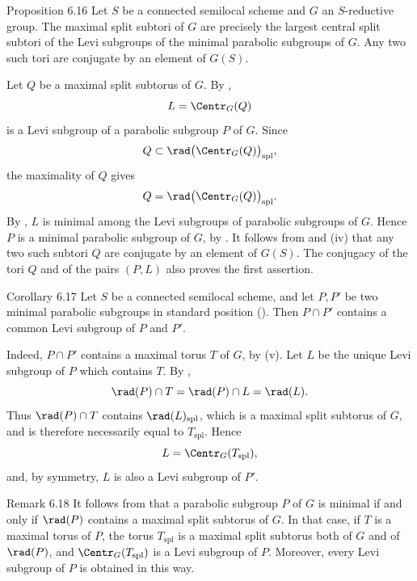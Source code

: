 \begin{sgastatement}{Proposition 6.16}
Let \(S\) be a connected semilocal scheme and \(G\) an
\(S\)-reductive group.  The maximal split subtori of \(G\) are
precisely the largest central split subtori of the Levi subgroups of
the minimal parabolic subgroups of \(G\).  Any two such tori are
conjugate by an element of \(G(S)\).
\end{sgastatement}

Let \(Q\) be a maximal split subtorus of \(G\).  By ,
\[
 L=\Centr_G(Q)
\]
is a Levi subgroup of a parabolic subgroup \(P\) of \(G\).  Since
\[
 Q\subset\rad\bigl(\Centr_G(Q)\bigr)_{\mathrm{spl}},
\]
the maximality of \(Q\) gives
\[
 Q=\rad\bigl(\Centr_G(Q)\bigr)_{\mathrm{spl}}.
\]
By , \(L\) is minimal among the Levi subgroups of parabolic
subgroups of \(G\).  Hence \(P\) is a minimal parabolic subgroup of
\(G\), by .  It follows from  and \textup{(iv)} that any
two such subtori \(Q\) are conjugate by an element of \(G(S)\).
The conjugacy of the tori \(Q\) and of the pairs \((P,L)\) also
proves the first assertion.

\begin{sgastatement}{Corollary 6.17}
Let \(S\) be a connected semilocal scheme, and let \(P,P'\) be two
minimal parabolic subgroups in standard position
\textup{()}.  Then \(P\cap P'\) contains a common Levi
subgroup of \(P\) and \(P'\).
\end{sgastatement}

Indeed, \(P\cap P'\) contains a maximal torus \(T\) of \(G\), by
\textup{(v)}.  Let \(L\) be the unique Levi subgroup of \(P\)
which contains \(T\).  By ,
\[
 \rad(P)\cap T=\rad(P)\cap L=\rad(L).
\]
Thus \(\rad(P)\cap T\) contains
\(\rad(L)_{\mathrm{spl}}\), which is a maximal split subtorus of
\(G\), and is therefore necessarily equal to
\(T_{\mathrm{spl}}\).  Hence
\[
 L=\Centr_G(T_{\mathrm{spl}}),
\]
and, by symmetry, \(L\) is also a Levi subgroup of \(P'\).

\begin{sgastatement}{Remark 6.18}
It follows from  that a parabolic subgroup \(P\) of \(G\) is
minimal if and only if \(\rad(P)\) contains a maximal split subtorus
of \(G\).  In that case, if \(T\) is a maximal torus of \(P\), the
torus \(T_{\mathrm{spl}}\) is a maximal split subtorus both of \(G\)
and of \(\rad(P)\), and \(\Centr_G(T_{\mathrm{spl}})\) is a Levi
subgroup of \(P\).  Moreover, every Levi subgroup of \(P\) is
obtained in this way.
\end{sgastatement}

